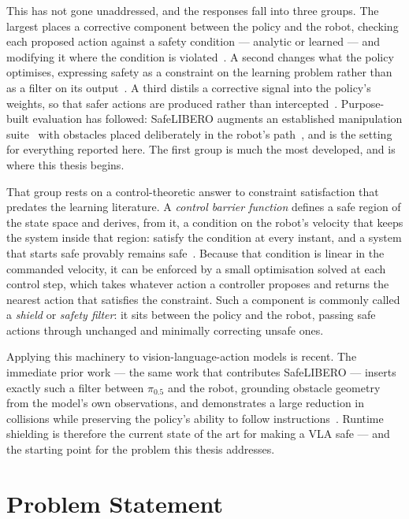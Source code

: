 \documentclass[a4paper,11pt]{report}
\begin{document}
This has not gone unaddressed, and the responses fall into three groups. The largest places a
corrective component between the policy and the robot, checking each proposed action against a
safety condition --- analytic or learned --- and modifying it where the condition is
violated~\cite{vlsa2026,meng2024conbat,sun2025lpb}. A second changes what the policy optimises,
expressing safety as a constraint on the learning problem rather than as a filter on its
output~\cite{safevla,safedojo}. A third distils a corrective signal into the policy's weights, so
that safer actions are produced rather than intercepted~\cite{wang2026roadvla}. Purpose-built
evaluation has followed: SafeLIBERO augments an established manipulation
suite~\cite{liu2023libero} with obstacles placed deliberately in the robot's path~\cite{vlsa2026},
and is the setting for everything reported here. The first group is much the most developed, and is
where this thesis begins.

That group rests on a control-theoretic answer to constraint satisfaction that predates the learning
literature. A \emph{control barrier function} defines a safe region of the state space and derives,
from it, a condition on the robot's velocity that keeps the system inside that region: satisfy the
condition at every instant, and a system that starts safe provably remains safe~\cite{ames2017cbf}.
Because that condition is linear in the commanded velocity, it can be enforced by a small
optimisation solved at each control step, which takes whatever action a controller proposes and
returns the nearest action that satisfies the constraint. Such a component is commonly called a
\emph{shield} or \emph{safety filter}: it sits between the policy and the robot, passing safe actions
through unchanged and minimally correcting unsafe ones.

Applying this machinery to vision-language-action models is recent. The immediate prior work --- the
same work that contributes SafeLIBERO --- inserts exactly such a filter between $\pi_{0.5}$ and the
robot, grounding obstacle geometry from the model's own observations, and demonstrates a large
reduction in collisions while preserving the policy's ability to follow
instructions~\cite{vlsa2026}. Runtime shielding is therefore the current state of the art for making
a VLA safe --- and the starting point for the problem this thesis addresses.

\section{Problem Statement}
\end{document}
